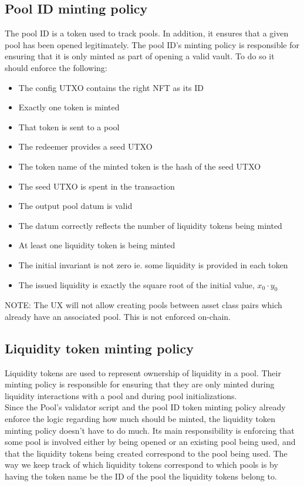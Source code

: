 \documentclass{article}
\begin{document}
\subsection{Pool ID minting policy}

The pool ID is a token used to track pools. In addition, it ensures that a given
pool has been opened legitimately. The pool ID's minting policy is responsible
for ensuring that it is only minted as part of opening a valid vault. To do so
it should enforce the following:

\begin{itemize}
  \item The config UTXO contains the right NFT as its ID
  \item Exactly one token is minted
  \item That token is sent to a pool
  \item The redeemer provides a seed UTXO
  \item The token name of the minted token is the hash of the seed UTXO
  \item The seed UTXO is spent in the transaction
  \item The output pool datum is valid
  \item The datum correctly reflects the number of liquidity tokens being minted
  \item At least one liquidity token is being minted
  \item The initial invariant is not zero ie. some liquidity is provided in each
    token
  \item The issued liquidity is exactly the square root of the initial value,
    $x_0 \cdot y_0$
\end{itemize}

NOTE: The UX will not allow creating pools between asset class pairs which
already have an associated pool. This is not enforced on-chain.

\subsection{Liquidity token minting policy}

Liquidity tokens are used to represent ownership of liquidity in a pool. Their
minting policy is responsible for ensuring that they are only minted during
liquidity interactions with a pool and during pool initializations. \\

Since the Pool's validator script and the pool ID token minting policy already
enforce the logic regarding how much should be minted, the liquidity token
minting policy doesn't have to do much. Its main responsibility is enforcing
that some pool is involved either by being opened or an existing pool being
used, and that the liquidity tokens being created correspond to the pool being
used. The way we keep track of which liquidity tokens correspond to which pools
is by having the token name be the ID of the pool the liquidity tokens belong
to. \\
\end{document}
